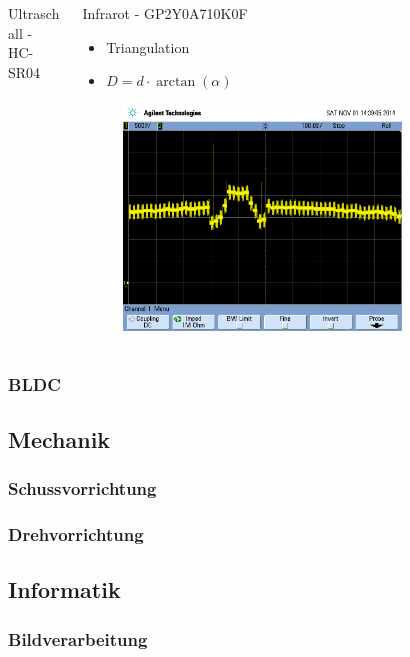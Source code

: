 \begin{frame}
\begin{columns}
\begin{column}{0.5\textwidth}
\begin{block}{Ultraschall - HC-SR04}
            \end{block}
        \end{column}
        \pause
        \begin{column}{0.5\textwidth}
            \begin{block}{Infrarot - GP2Y0A710K0F}
                \begin{itemize}
                    \item Triangulation
                    \item $D = d \cdot \arctan(\alpha)$
                \end{itemize}
                \pause
                \begin{figure}
                    \includegraphics[width=0.8\textwidth]{../doc/fig/scope_80.png}
                \end{figure}
            \end{block}
        \end{column}
    \end{columns}
\end{frame}

\begin{frame}
    \frametitle{BLDC}
\end{frame}

\subsection{Mechanik}
\begin{frame}
    \frametitle{Schussvorrichtung}
\end{frame}
\begin{frame}
    \frametitle{Drehvorrichtung}
\end{frame}

\subsection{Informatik}
\begin{frame}
    \frametitle{Bildverarbeitung}
\end{frame}

